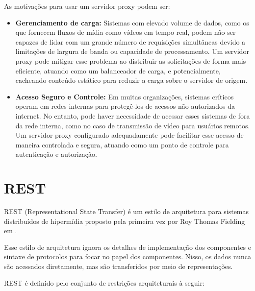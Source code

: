 \documentclass[12pt, %
openright, 
oneside, %
a4paper,    %
brazil]{facom-ufu-abntex2}
\begin{document}
As motivações para usar um servidor proxy podem ser:

\begin{itemize}
	\item \textbf{Gerenciamento de carga:} Sistemas com elevado volume de
	      dados, como os que fornecem fluxos de mídia como vídeos em tempo
	      real, podem não ser capazes de lidar com um grande número de requisições
	      simultâneas devido a limitações de largura de banda ou capacidade de
	      processamento. Um servidor proxy pode mitigar esse problema ao distribuir as
	      solicitações de forma mais eficiente, atuando como um balanceador de carga, e
	      potencialmente, cacheando conteúdo estático para reduzir a carga sobre o
	      servidor de origem.
	\item \textbf{Acesso Seguro e Controle:} Em muitas organizações,
	      sistemas críticos operam em redes internas para protegê-los de acessos não
	      autorizados da internet. No entanto, pode haver necessidade de acessar esses
	      sistemas de fora da rede interna, como no caso de transmissão de vídeo para
	      usuários remotos. Um servidor proxy configurado adequadamente pode facilitar
	      esse acesso de maneira controlada e segura, atuando como um ponto de controle
	      para autenticação e autorização.

\end{itemize}

\section{REST}

REST (Representational State Transfer) é um estilo de arquitetura para sistemas
distribuídos de hipermídia proposto pela primeira vez por Roy Thomas Fielding
em .

Esse estilo de arquitetura ignora os detalhes de implementação dos componentes
e sintaxe de protocolos para focar no papel dos componentes. Nisso, os dados
nunca são acessados diretamente, mas são transferidos por meio de
representações.

REST é definido pelo conjunto de restrições arquiteturais à seguir:
\end{document}
